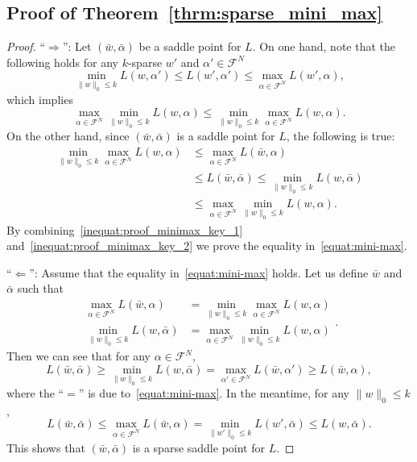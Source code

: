 \documentclass[11pt]{article}
\numberwithin{equation}{section}
\numberwithin{table}{section}
\numberwithin{figure}{section}
\begin{document}
\subsection{Proof of Theorem~\ref{thrm:sparse_mini_max}}
\label{append:proof_sparse_mini_max}
\begin{proof}
``$\Rightarrow$'': Let $(\bar w, \bar\alpha)$ be a saddle point for $L$. On one hand, note that the following holds for any $k$-sparse $w'$ and $\alpha' \in \mathcal{F}^N$
\[
\min_{\|w\|_0 \le k} L(w, \alpha') \le L(w',\alpha') \le \max_{\alpha \in \mathcal{F}^N}L(w', \alpha),
\]
which implies
\begin{equation}\label{inequat:proof_minimax_key_1}
\max_{\alpha \in \mathcal{F}^N} \min_{\|w\|_0\le k} L(w, \alpha) \le \min_{\|w\|_0\le k}\max_{\alpha \in \mathcal{F}^N} L(w,\alpha).
\end{equation}
On the other hand, since $(\bar w, \bar \alpha)$ is a saddle point for $L$, the following is true:
\begin{equation}\label{inequat:proof_minimax_key_2}
\begin{aligned}
\min_{\|w\|_0 \le k} \max_{\alpha \in \mathcal{F}^N} L(w,\alpha) &\le \max_{\alpha \in \mathcal{F}^N} L(\bar w, \alpha) \\
&\le L(\bar w, \bar \alpha) \le \min_{\|w\|_0\le k} L(w, \bar \alpha) \\
&\le \max_{\alpha \in \mathcal{F}^N}\min_{\|w\|_0\le k} L(w,\alpha).
\end{aligned}
\end{equation}
By combining~\eqref{inequat:proof_minimax_key_1} and~\eqref{inequat:proof_minimax_key_2} we prove the equality in~\eqref{equat:mini-max}.

``$\Leftarrow$'': Assume that the equality in~\eqref{equat:mini-max} holds. Let us define $\bar w$ and $\bar \alpha$ such that
\[
\begin{aligned}
\max_{\alpha \in \mathcal{F}^N}L(\bar w, \alpha) &= \min_{\|w\|_0 \le k}\max_{\alpha \in \mathcal{F}^N}L(w, \alpha) \\
\min_{\|w\|_0 \le k}L(w, \bar\alpha) &=\max_{\alpha \in \mathcal{F}^N}\min_{\|w\|_0 \le k}L(w, \alpha)
\end{aligned}.
\]
Then we can see that for any $\alpha \in \mathcal{F}^N$,
\[
L(\bar w, \bar\alpha) \ge \min_{\|w\|_0\le k} L(w,\bar\alpha) = \max_{\alpha' \in \mathcal{F}^N}L(\bar w, \alpha') \ge L(\bar w, \alpha),
\]
where the ``$=$'' is due to~\eqref{equat:mini-max}. In the meantime, for any $\|w\|_0\le k$,
\[
L(\bar w, \bar\alpha) \le \max_{\alpha \in \mathcal{F}^N}L(\bar w, \alpha) = \min_{\|w'\|_0\le k} L(w',\bar\alpha) \le L(w, \bar \alpha).
\]
This shows that $(\bar w,\bar\alpha)$ is a sparse saddle point for $L$.
\end{proof}
\end{document}
